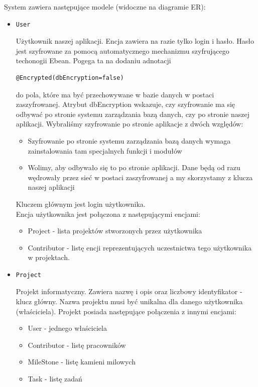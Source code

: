 \documentclass[a4paper,12pt,notitlepage]{mwrep}
\begin{document}
System zawiera następujące modele (widoczne na diagramie ER):
\begin{itemize}
	\item	\begin{verbatim}User\end{verbatim} Użytkownik naszej aplikacji. Encja zawiera na razie tylko login i hasło. Hasło jest szyfrowane 
		za pomocą automatycznego mechanizmu szyfrującego techonogii Ebean. Pogega ta na dodaniu adnotacji 
		\begin{verbatim}@Encrypted(dbEncryption=false)\end{verbatim} do pola, które ma być przechowywane w bazie danych w postaci 
		zaszyfrowanej. Atrybut dbEncryption wskazuje, czy szyfrowanie ma się odbywać po stronie systemu zarządzania bazą danych, czy po 
		stronie naszej aplikacji. Wybraliśmy szyfrowanie po stronie aplikacje z dwóch względów:
		\begin{itemize}
			\item	Szyfrowanie po stronie systemu zarządzania bazą danych wymaga zainstalowania tam specjalnych funkcji i modułów
			\item	Wolimy, aby odbywało się to po stronie aplikacji. Dane będą od razu wędrowały przez sieć w postaci zaszyfrowanej 
				a my skorzystamy z klucza naszej aplikacji
		\end{itemize}
		Kluczem głównym jest login użytkownika.\\
		Encja użytkownika jest połączona z następującymi encjami:
		\begin{itemize}
			\item	Project - lista projektów stworzonych przez użytkownika
			\item	Contributor - listę encji reprezentujących uczestnictwa tego użytkownika w projektach.
		\end{itemize}

	\item	\begin{verbatim}Project\end{verbatim} Projekt informatyczny. Zawiera nazwę i opis oraz liczbowy identyfikator - klucz główny. 
		Nazwa projektu musi być unikalna dla danego użytkownika (właściciela). Projekt posiada następujące połączenia z innymi encjami:
		\begin{itemize}
			\item	User - jednego właściciela
			\item	Contributor - listę pracowników
			\item	MileStone - listę kamieni milowych
			\item	Task - listę zadań
		\end{itemize}


\end{itemize}
\end{document}
